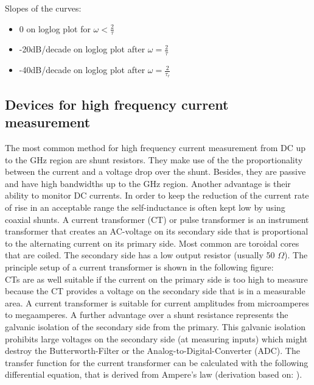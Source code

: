 Slopes of the curves: \newline
\begin{itemize}
 \item 0 on loglog plot for $\omega < \frac{2}{\tau}$\newline
\item -20dB/decade on loglog plot after $\omega = \frac{2}{\tau}$ \newline
\item -40dB/decade on loglog plot after $\omega = \frac{2}{\tau_r}$\newline

\end{itemize}




	
\subsection{Devices for high frequency current measurement}
The most common method for high frequency current measurement from DC up to the GHz region are shunt resistors. They make use of the the proportionality between the current and a voltage drop over the shunt. Besides, they are passive and have high bandwidths up to the GHz region. Another advantage is their ability to monitor DC currents. In order to keep the reduction of the current rate of rise in an acceptable range the self-inductance is often kept low by using coaxial shunts. \cite{highdynamiccurrent}
A current transformer (CT) or pulse transformer is an instrument transformer that creates an AC-voltage on its secondary side that is proportional to the alternating current on its primary side. Most common are toroidal cores that are coiled. The secondary side has a low output resistor (usually 50 $\Omega$).
The principle setup of a current transformer is shown in the following figure: 
\\CTs are as well suitable if the current on the primary side is too high to measure because the CT provides a voltage on the secondary side that is in a measurable area. A current transformer is suitable for current amplitudes from microamperes to megaamperes. A further advantage over a shunt resistance represents the galvanic isolation of the secondary side from the primary. This galvanic isolation prohibits large voltages on the secondary side (at measuring inputs) which might destroy the Butterworth-Filter or the Analog-to-Digital-Converter (ADC). 
The transfer function for the current transformer can be calculated with the following differential equation, that is derived from Ampere's law (derivation based on: \cite{highdynamiccurrent}).\\
